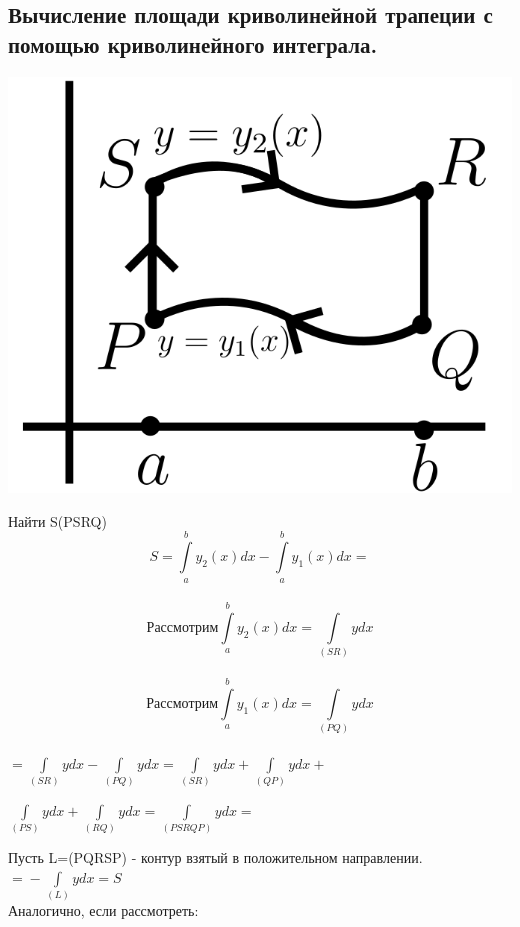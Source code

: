 \documentclass[12pt]{article}
\let\ORIincludegraphics\includegraphics
\renewcommand{\includegraphics}[2][]{\ORIincludegraphics[scale=0.65,#1]{#2}}
\let\oldint\int
\renewcommand{\int}{\oldint\limits}
\begin{document}
  \subsection{Вычисление площади криволинейной трапеции с помощью криволинейного интеграла.}
  \begin{minipage}{0.45\textwidth}
    \includegraphics[scale=0.6]{8.5.1.png}
  \end{minipage}
  \hspace{1em}
  \begin{minipage}{0.55\textwidth}
    Найти S(PSRQ)\\
    \[S=\int_{a}^{b}y_2(x)dx-\int_{a}^{b}y_1(x)dx \boxed{=}\]\\
     \[\text{Рассмотрим} \int_{a}^{b}y_2(x)dx=\int_{(SR)}ydx\]\\
      \[\text{Рассмотрим}\int_{a}^{b}y_1(x)dx=\int_{(PQ)}ydx\]\\
    $\boxed{=} \int_{(SR)}ydx-\int_{(PQ)}ydx=\int_{(SR)}ydx+\int_{(QP)}ydx+$ \\ 
    \par
    $\int_{(PS)}ydx+\int_{(RQ)}ydx=\int_{(PSRQP)}ydx \boxed{=}$
  \end{minipage}
  \vspace{1em}
  \par
  Пусть L=(PQRSP) - контур взятый в положительном направлении. $\boxed{=}-\int_{(L)}ydx=S$\\
  Аналогично, если рассмотреть:
\end{document}

